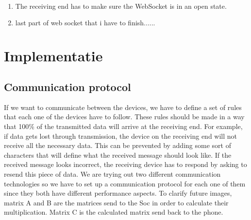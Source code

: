 \documentclass[a4paper, 11pt]{report}
\begin{document}
	\begin{enumerate}
		\item The receiving end has to make sure the WebSocket is in an open state. 
		\item last part of web socket that i have to finish......
	\end{enumerate}
		

	
	
	\chapter{Implementatie}
	
	
\section{Communication protocol}
If we want to communicate between the devices, we have to define a set of rules that each one of the devices have to follow. These rules should be made in a way that 100\% of the transmitted data will arrive at the receiving end. For example, if data gets lost through transmission, the device on the receiving end will not receive all the necessary data. This can be prevented by adding some sort of characters that will define what the received message should look like. If the received message looks incorrect, the receiving device has to respond by asking to resend this piece of data. We are trying out two different communication technologies so we have to set up a communication protocol for each one of them since they both have different performance aspects. To clarify future images, matrix A and B are the matrices send to the Soc in order to calculate their multiplication. Matrix C is the calculated matrix send back to the phone.
\end{document}

